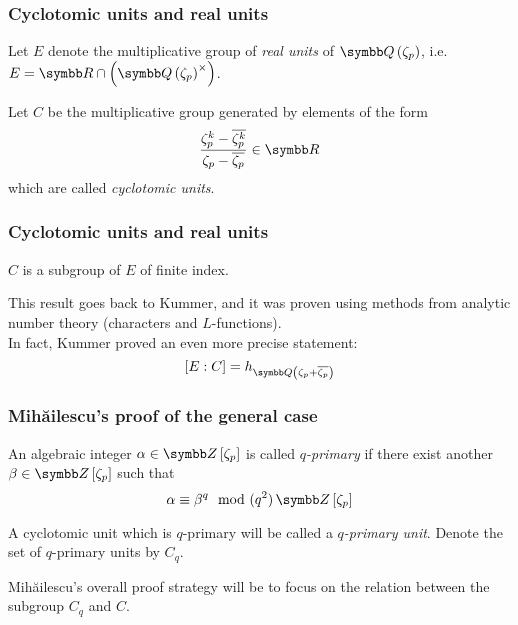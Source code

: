 \begin{frame}
\frametitle{Cyclotomic units and real units}

\begin{definition}
Let \(E\) denote the multiplicative group of \emph{real units} of \(\rationals\left(\zeta_p\right)\), i.e.\ \(E = \reals \cap \left(\rationals\left(\zeta_p\right)^{\times}\right)\).
\end{definition}

\begin{definition}
Let \(C\) be the multiplicative group generated by elements of the form
\[
    \frac{\zeta_p^k - \overline{\zeta_p^k}}{\zeta_p - \overline{\zeta_p}} \in \reals
\]
which are called \emph{cyclotomic units}.
\end{definition}
\end{frame}

\begin{frame}
\frametitle{Cyclotomic units and real units}

\begin{proposition}
\(C\) is a subgroup of \(E\) of finite index.
\end{proposition}

\vspace{1em}

This result goes back to Kummer, and it was proven using methods from analytic number theory (characters and \(L\)-functions). \\[1em]

In fact, Kummer proved an even more precise statement:
\[
    \left[E : C\right] = h_{\rationals\left(\zeta_p + \overline{\zeta_p}\right)}
\]
\end{frame}

\begin{frame}
\frametitle{Mihăilescu's proof of the general case}

\begin{definition}
An algebraic integer \(\alpha \in \integers\left[\zeta_p\right]\) is called \emph{\(q\)-primary} if there exist another \(\beta \in \integers\left[\zeta_p\right]\) such that
\[
    \alpha \equiv \beta^q \mod{(q^2) \, \integers\left[\zeta_p\right]}
\]
\end{definition}

\begin{definition}
A cyclotomic unit which is \(q\)-primary will be called a \emph{\(q\)-primary unit}. Denote the set of \(q\)-primary units by \(C_q\).
\end{definition} 

\vspace{1em}

Mihăilescu's overall proof strategy will be to focus on the relation between the subgroup \(C_q\) and \(C\).
\end{frame}

